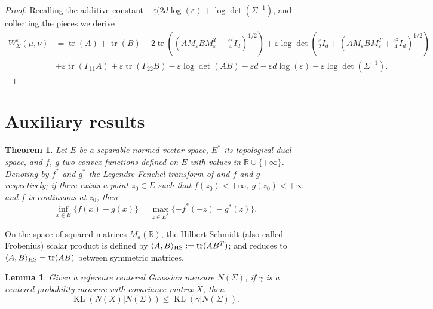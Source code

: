 \documentclass[]{article}
\DeclareMathOperator{\KL}{KL}
\DeclareMathOperator{\tr}{tr}
\numberwithin{equation}{section}
\theoremstyle{plain}
\newtheorem{thm}{Theorem}[section]
\newtheorem{lem}{Lemma}[section]
\begin{document}
{\begin{proof}
	Recalling the additive constant $-\varepsilon (2d \log(\varepsilon)+\log \det(\Sigma^{-1})$, and collecting the pieces we derive
	\begin{align*}
		W_{\Sigma}^{\varepsilon}(\mu, \nu)& = \tr(A) + \tr(B) - 2 \tr\left( \left(AM_{\varepsilon}BM_{\varepsilon}^T+ \frac{\varepsilon^2}{4}I_d \right)^{1/2} \right) + \varepsilon \log \det\left( \frac{\varepsilon}{2}I_d + \left(AM_{\varepsilon}BM_{\varepsilon}^T+ \frac{\varepsilon^2}{4}I_d \right)^{1/2} \right) \\
		&+\varepsilon \tr (\Gamma_{11} A )  +\varepsilon \tr (\Gamma_{22} B ) - \varepsilon \log \det(AB) - \varepsilon d - \varepsilon d \log(\varepsilon) - \varepsilon\log \det(\Sigma^{-1}).
	\end{align*}
\end{proof}

\section{Auxiliary results}\label{sec:auxiliary}




\begin{thm}\cite[p.~24, Thm.~1.9]{villani2021topics}
	\label{thm:duality_convex}
	Let $E$ be a separable normed vector space, $E^*$ its topological dual space, and $f$, $g$ two convex functions defined on $E$ with values in $\mathbb{R} \cup \{+\infty\}$. Denoting by $f^*$ and $g^*$ the Legendre-Fenchel transform of and $f$ and $g$ respectively; if there exists a point $z_0 \in E$ such that $f(z_0) < +\infty$, $g(z_0) < +\infty$ and $f$ is continuous at $z_0$, then 
	\begin{equation}
		\inf_{x \in E}\{ f(x) + g(x)\} = \max_{z \in E^*}\{- f^*(-z) - g^*(z)\}. 
	\end{equation}
\end{thm}



On the space of squared matrices $M_d(\mathbb{R})$, the Hilbert-Schmidt (also called Frobenius) scalar product is defined by $\langle A,B \rangle_{\rm HS} := \tr(A B^T)$; and reduces to $\langle A,B \rangle_{\rm HS}  = \tr(AB)$ between symmetric matrices.

\begin{lem}\label{lem:optim_kl_gauss} \cite[p.~34,~Ex.~17]{pardo2018statistical}\label{lem:divergence_covariance} Given a reference centered Gaussian measure $N(\Sigma)$, if $\gamma$ is a centered probability measure with covariance matrix $X$, then
	\begin{equation}
		\KL(N(X)| N(\Sigma)) \leq \KL(\gamma| N(\Sigma)).
	\end{equation}  
\end{lem}

}
\end{document}
